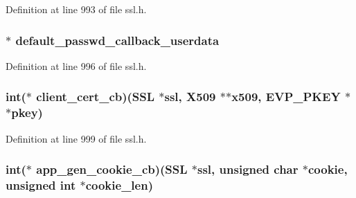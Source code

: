 Definition at line 993 of file ssl.\+h.

\subsubsection[{\texorpdfstring{default\+\_\+passwd\+\_\+callback\+\_\+userdata}{default_passwd_callback_userdata}}]{ $\ast$ default\+\_\+passwd\+\_\+callback\+\_\+userdata}\hypertarget{structssl__ctx__st_a5978b0907ec6d9e4e07e9f1f23203361}{}\label{structssl__ctx__st_a5978b0907ec6d9e4e07e9f1f23203361}


Definition at line 996 of file ssl.\+h.

\subsubsection[{\texorpdfstring{client\+\_\+cert\+\_\+cb}{client_cert_cb}}]{\setlength{\rightskip}{0pt plus 5cm}int($\ast$ client\+\_\+cert\+\_\+cb)({\bf S\+SL} $\ast$ssl, {\bf X509} $\ast$$\ast$x509, {\bf E\+V\+P\+\_\+\+P\+K\+EY} $\ast$$\ast$pkey)}\hypertarget{structssl__ctx__st_a82686fb1e9e6b347286f43fd8745c963}{}\label{structssl__ctx__st_a82686fb1e9e6b347286f43fd8745c963}


Definition at line 999 of file ssl.\+h.

\subsubsection[{\texorpdfstring{app\+\_\+gen\+\_\+cookie\+\_\+cb}{app_gen_cookie_cb}}]{\setlength{\rightskip}{0pt plus 5cm}int($\ast$ app\+\_\+gen\+\_\+cookie\+\_\+cb)({\bf S\+SL} $\ast$ssl, unsigned char $\ast$cookie, unsigned int $\ast$cookie\+\_\+len)}\hypertarget{structssl__ctx__st_a225f64b68ff31a25dae5073768f6a1c2}{}\label{structssl__ctx__st_a225f64b68ff31a25dae5073768f6a1c2}


